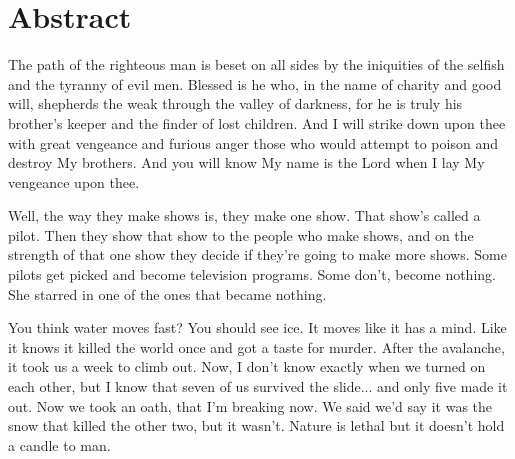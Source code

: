 \chapter*{Abstract}

The path of the righteous man is beset on all sides by the iniquities of the selfish and the tyranny of evil men. Blessed is he who, in the name of charity and good will, shepherds the weak through the valley of darkness, for he is truly his brother's keeper and the finder of lost children. And I will strike down upon thee with great vengeance and furious anger those who would attempt to poison and destroy My brothers. And you will know My name is the Lord when I lay My vengeance upon thee.

Well, the way they make shows is, they make one show. That show's called a pilot. Then they show that show to the people who make shows, and on the strength of that one show they decide if they're going to make more shows. Some pilots get picked and become television programs. Some don't, become nothing. She starred in one of the ones that became nothing.

You think water moves fast? You should see ice. It moves like it has a mind. Like it knows it killed the world once and got a taste for murder. After the avalanche, it took us a week to climb out. Now, I don't know exactly when we turned on each other, but I know that seven of us survived the slide... and only five made it out. Now we took an oath, that I'm breaking now. We said we'd say it was the snow that killed the other two, but it wasn't. Nature is lethal but it doesn't hold a candle to man.


